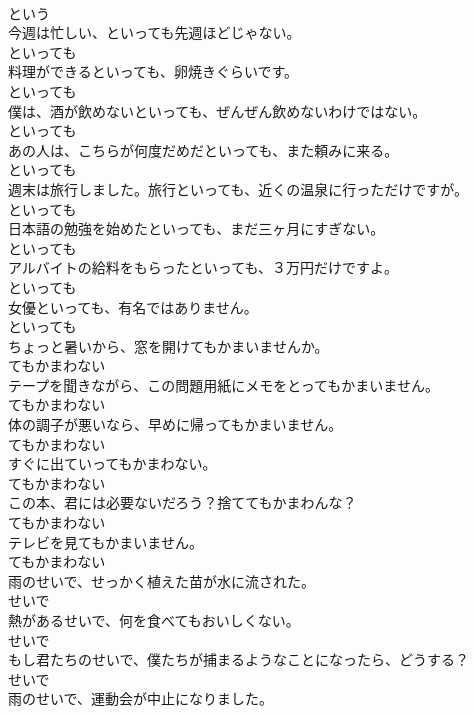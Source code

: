\documentclass[8pt]{extreport}
\begin{document}
\begin{CJK}{UTF8}{min}
\\	という
\\	今週は忙しい、といっても先週ほどじゃない。	
\\	といっても
\\	料理ができるといっても、卵焼きぐらいです。	
\\	といっても
\\	僕は、酒が飲めないといっても、ぜんぜん飲めないわけではない。	
\\	といっても
\\	あの人は、こちらが何度だめだといっても、また頼みに来る。	
\\	といっても
\\	週末は旅行しました。旅行といっても、近くの温泉に行っただけですが。	
\\	といっても
\\	日本語の勉強を始めたといっても、まだ三ヶ月にすぎない。	
\\	といっても
\\	アルバイトの給料をもらったといっても、３万円だけですよ。	
\\	といっても
\\	女優といっても、有名ではありません。	
\\	といっても
\\	ちょっと暑いから、窓を開けてもかまいませんか。	
\\	てもかまわない
\\	テープを聞きながら、この問題用紙にメモをとってもかまいません。	
\\	てもかまわない
\\	体の調子が悪いなら、早めに帰ってもかまいません。	
\\	てもかまわない
\\	すぐに出ていってもかまわない。	
\\	てもかまわない
\\	この本、君には必要ないだろう？捨ててもかまわんな？	
\\	てもかまわない
\\	テレビを見てもかまいません。	
\\	てもかまわない
\\	雨のせいで、せっかく植えた苗が水に流された。	
\\	せいで
\\	熱があるせいで、何を食べてもおいしくない。	
\\	せいで
\\	もし君たちのせいで、僕たちが捕まるようなことになったら、どうする？	
\\	せいで
\\	雨のせいで、運動会が中止になりました。	

\end{CJK}
\end{document}
